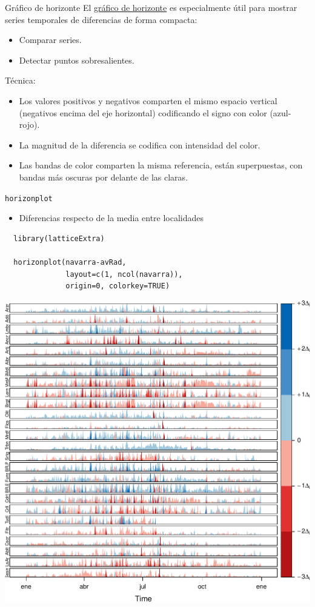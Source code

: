 \documentclass[xcolor={usenames,svgnames,dvipsnames}]{beamer}
\begin{document}
\begin{frame}[label=sec-3-3-1]{Gráfico de horizonte}
El \href{http://www.perceptualedge.com/articles/visual_business_intelligence/time_on_the_horizon.pdf}{gráfico de horizonte} es especialmente útil para mostrar series temporales de diferencias de forma compacta:
\begin{itemize}
\item Comparar series.
\item Detectar puntos sobresalientes.
\end{itemize}

Técnica:
\begin{itemize}
\item Los valores positivos y negativos comparten el mismo espacio
vertical (negativos encima del eje horizontal) codificando el signo
con color (azul-rojo).
\item La magnitud de la diferencia se codifica con intensidad del color.
\item Las bandas de color comparten la misma referencia, están superpuestas, con bandas más oscuras por delante de las claras.
\end{itemize}
\end{frame}

\begin{frame}[fragile,label=sec-3-3-2]{\texttt{horizonplot}}
 \begin{itemize}
\item Diferencias respecto de la media entre localidades
\end{itemize}
\lstset{language=R,label= ,caption= ,numbers=none}
\begin{lstlisting}
  library(latticeExtra)
  
  horizonplot(navarra-avRad,
              layout=c(1, ncol(navarra)),
              origin=0, colorkey=TRUE)
\end{lstlisting}
\end{frame}

\begin{frame}[label=sec-3-3-3]{}
\includegraphics[width=.9\linewidth]{figs/navarraHorizonplot.pdf}
\end{frame}
\end{document}
